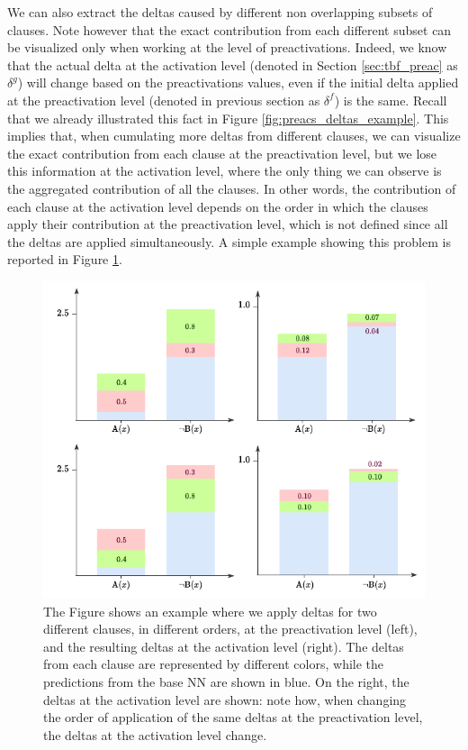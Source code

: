 We can also extract the deltas caused by different non overlapping subsets of clauses. Note however that the exact contribution from each different subset can be visualized only when working at the level of preactivations. Indeed, we know that the actual delta at the activation level (denoted in Section \ref{sec:tbf_preac} as $\delta^g$) will change based on the preactivations values, even if the initial delta applied at the preactivation level (denoted in previous section as $\delta^f$) is the same. Recall that we already illustrated this fact in Figure \ref{fig:preacs_deltas_example}. This implies that, when cumulating more deltas from different clauses, we can visualize the exact contribution from each clause at the preactivation level, but we lose this information at the activation level, where the only thing we can observe is the aggregated contribution of all the clauses. In other words, the contribution of each clause at the activation level depends on the order in which the clauses apply their contribution at the preactivation level, which is not defined since all the deltas are applied simultaneously. A simple example showing this problem is reported in Figure \ref{fig:ex_more_clauses}.
 
 \begin{figure}
 	\centering
 	\includegraphics[width=0.75\linewidth]{figures/example_more_clauses.pdf}
 	\caption{The Figure shows an example where we apply deltas for two different clauses, in different orders, at the preactivation level (left), and the resulting deltas at the activation level (right). The deltas from each clause are represented by different colors, while the predictions from the base NN are shown in blue. On the right, the deltas at the activation level are shown: note how, when changing the order of application of the same deltas at the preactivation level, the deltas at the activation level change.}
 	\label{fig:ex_more_clauses}
 \end{figure}

